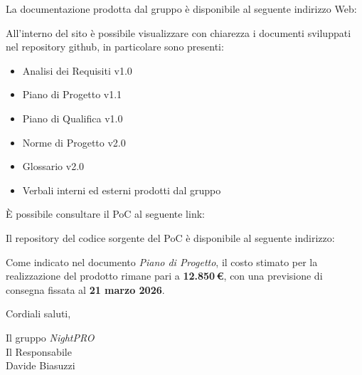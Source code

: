 \documentclass[a4paper, 11pt, oneside]{scrartcl} %
\begin{document}
La documentazione prodotta dal gruppo è disponibile al seguente indirizzo Web:

\begin{center}

\end{center}

All'interno del sito è possibile visualizzare con chiarezza i documenti sviluppati nel repository github, in particolare sono presenti:
\begin{itemize}
    \item Analisi dei Requisiti v1.0
    \item Piano di Progetto v1.1
    \item Piano di Qualifica v1.0
    \item Norme di Progetto v2.0
    \item Glossario v2.0
    \item Verbali interni ed esterni prodotti dal gruppo
\end{itemize}

È possibile consultare il PoC al seguente link:

    \begin{center}

\end{center}

Il repository del codice sorgente del PoC è disponibile al seguente indirizzo:

    \begin{center}

\end{center}
Come indicato nel documento \textit{Piano di Progetto}, il costo stimato per la realizzazione del prodotto rimane pari a \textbf{12.850\,€}, con una previsione di consegna fissata al \textbf{21 marzo 2026}.

\vspace{0.5cm}

Cordiali saluti,
\begin{flushright}
    Il gruppo \emph{NightPRO}\\[1cm]
    Il Responsabile\\[0.3cm]
    Davide Biasuzzi
\end{flushright}
\end{document}
